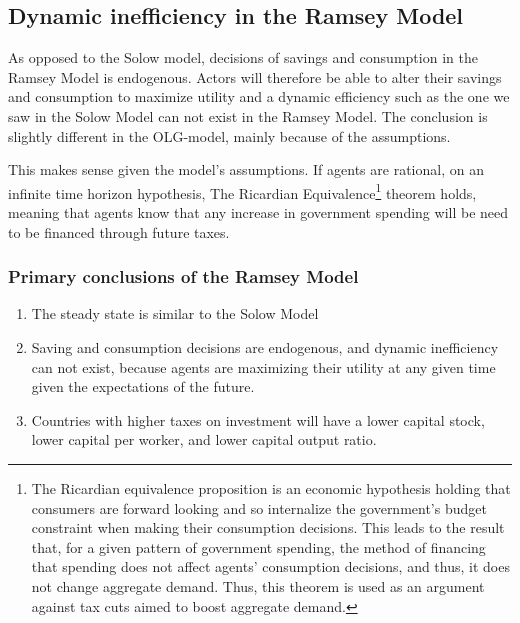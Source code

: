 \clearpage

\subsection*{Dynamic inefficiency in the Ramsey Model}
As opposed to the Solow model, decisions of savings and consumption in the Ramsey Model is endogenous. Actors will therefore be able to alter their savings and consumption to maximize utility and a dynamic efficiency such as the one we saw in the Solow Model can not exist in the Ramsey Model. The conclusion is slightly different in the OLG-model, mainly because of the assumptions. 

This makes sense given the model's assumptions. If agents are rational, on an infinite time horizon hypothesis, The Ricardian Equivalence\footnote{The Ricardian equivalence proposition is an economic hypothesis holding that consumers are forward looking and so internalize the government's budget constraint when making their consumption decisions. This leads to the result that, for a given pattern of government spending, the method of financing that spending does not affect agents' consumption decisions, and thus, it does not change aggregate demand. Thus, this theorem is used as an argument against tax cuts aimed to boost aggregate demand.} theorem holds, meaning that agents know that any increase in government spending will be need to be financed through future taxes.


\subsubsection{Primary conclusions of the Ramsey Model}
\begin{enumerate}[i]
  \item The steady state is similar to the Solow Model
  \item Saving and consumption decisions are endogenous, and dynamic inefficiency can not exist, because agents are maximizing their utility at any given time given the expectations of the future. 
  \item Countries with higher taxes on investment will have a lower capital stock, lower capital per worker, and lower capital output ratio.
\end{enumerate}